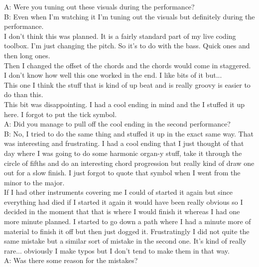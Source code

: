 A: Were you tuning out these visuals during the performance?\\

B: Even when I'm watching it I'm tuning out the visuals but definitely during the performance.\\

I don't think this was planned. It is a fairly standard part of my live coding toolbox. I'm just changing the pitch. So it's to do with the bass. Quick ones and then long ones.\\

Then I changed the offset of the chords and the chords would come in staggered. I don't know how well this one worked in the end. I like bits of it but...\\

This one I think the stuff that is kind of up beat and is really groovy is easier to do than this.\\

This bit was disappointing. I had a cool ending in mind and the I stuffed it up here. I forgot to put the tick symbol.\\

A: Did you manage to pull off the cool ending in the second performance?\\

B: No, I tried to do the same thing and stuffed it up in the exact same way. That was interesting and frustrating. I had a cool ending that I just thought of that day where I was going to do some harmonic organ-y stuff, take it through the circle of fifths and do an interesting chord progression but really kind of draw one out for a slow finish. I just forgot to quote that symbol when I went from the minor to the major.\\

If I had other instruments covering me I could of started it again but since everything had died if I started it again it would have been really obvious so I decided in the moment that that is where I would finish it whereas I had one more minute planned. I started to go down a path where I had a minute more of material to finish it off but then just dogged it. Frustratingly I did not quite the same mistake but a similar sort of mistake in the second one. It's kind of really rare... obviously I make typos but I don't tend to make them in that way.\\

A: Was there some reason for the mistakes?\\

